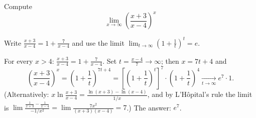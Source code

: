 
\begin{question}
Compute
\[ \lim_{x\longrightarrow\infty}\left(\frac{x+3}{x-4}\right)^x \]
\end{question}

\begin{hint}
Write $\frac{x+3}{x-4}=1+\frac{7}{x-4}$ and use the limit $\lim_{t\to\infty}\left(1+\frac1t\right)^t=e$.
\end{hint}

\begin{solution}
For every $x>4$: $\frac{x+3}{x-4}=1+\frac{7}{x-4}$. Set $t=\frac{x-4}{7}\to\infty$; then $x=7t+4$ and
\[ \left(\frac{x+3}{x-4}\right)^x=\left(1+\frac1t\right)^{7t+4}=\left[\left(1+\frac1t\right)^{t}\right]^7\cdot\left(1+\frac1t\right)^4\xrightarrow[t\to\infty]{}e^7\cdot1. \]
(Alternatively: $x\ln\frac{x+3}{x-4}=\frac{\ln(x+3)-\ln(x-4)}{1/x}$, and by L'Hôpital's rule the limit is $\lim\frac{\frac1{x+3}-\frac1{x-4}}{-1/x^2}=\lim\frac{7x^2}{(x+3)(x-4)}=7$.)
The answer: $\boxed{e^7}$.
\end{solution}
